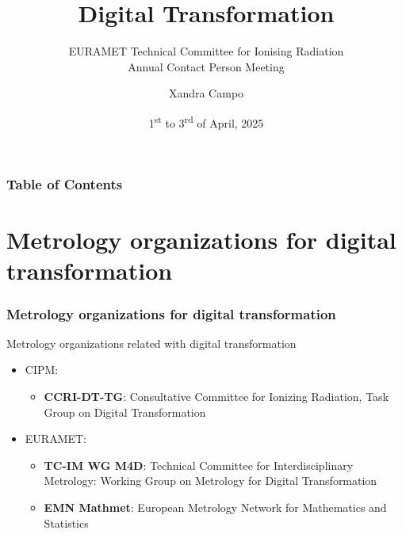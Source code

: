 \documentclass{beamer}
\title[TC IR: Digital Transformation]{Digital Transformation}
\subtitle[EURAMET TC IR]{EURAMET Technical Committee for Ionising Radiation\\Annual Contact Person Meeting}
\date[1-3 April 2025]{1\textsuperscript{st} to 3\textsuperscript{rd} of April, 2025}
\author[X. Campo]{Xandra Campo}
\institute[CIEMAT]{CIEMAT, Spain}
\begin{document}
    \maketitle


    \begin{frame}
        \frametitle{Table of Contents}
        \tableofcontents[hideallsubsections]
    \end{frame}


    \section{Metrology organizations for digital transformation}

    \begin{frame}
        \frametitle{Metrology organizations for digital transformation}
        Metrology organizations related with digital transformation
        \begin{itemize}
            \item CIPM:
            \begin{itemize}
                \item \textbf{CCRI-DT-TG}: Consultative Committee for Ionizing Radiation, Task Group on Digital Transformation
                    {\color{blue} \href{https://www.bipm.org/en/committees/cc/ccri/wg/ccri-dt-tg}{\faExternalLink}}
            \end{itemize}
            \item EURAMET:
            \begin{itemize}
                \item \textbf{TC-IM WG M4D}: Technical Committee for Interdisciplinary Metrology: Working Group on Metrology for Digital Transformation
                    {\color{blue} \href{https://www.euramet.org/technical-committees/tc-im/metrology-for-digital-transformation}{\faExternalLink}}
                \item \textbf{EMN Mathmet}: European Metrology Network for Mathematics and Statistics
                    {\color{blue} \href{https://www.euramet.org/european-metrology-networks/mathmet}{\faExternalLink}}
            \end{itemize}
        \end{itemize}
    \end{frame}
\end{document}
